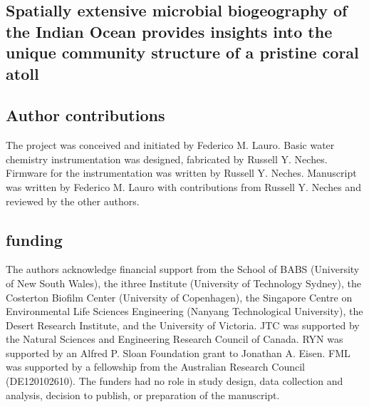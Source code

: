 \begin{refsection}

\chapter{Spatially extensive microbial biogeography of the Indian Ocean provides insights into the unique community structure of a pristine coral atoll}


\section{Author contributions}

The project was conceived and initiated by Federico M. Lauro. Basic
water chemistry instrumentation was designed, fabricated by Russell Y.
Neches. Firmware for the instrumentation was written by Russell Y.
Neches. Manuscript was written by Federico M. Lauro with contributions
from Russell Y. Neches and reviewed by the other authors.






\section{funding}

The authors acknowledge financial support from the School of BABS (University of New South Wales), the ithree Institute (University of Technology Sydney), the Costerton Biofilm Center (University of Copenhagen), the Singapore Centre on Environmental Life Sciences Engineering (Nanyang Technological University), the Desert Research Institute, and the University of Victoria. JTC was supported by the Natural Sciences and Engineering Research Council of Canada. RYN was supported by an Alfred P. Sloan Foundation grant to Jonathan A. Eisen. FML was supported by a fellowship from the Australian Research Council (DE120102610). The funders had no role in study design, data collection and analysis, decision to publish, or preparation of the manuscript.


\end{refsection}
